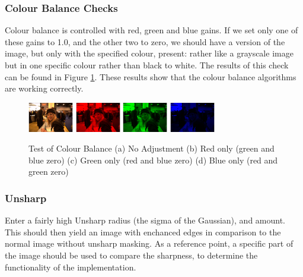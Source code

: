 \documentclass[10pt,a4paper]{article}
\begin{document}
\subsubsection{Colour Balance Checks}
Colour balance is controlled with red, green and blue gains. If we set only one of these gains to 1.0, and the other two to zero, we should
have a version of the image, but only with the specified colour, present: rather like a grayscale image but in one specific colour rather than black to white.
The results of this check can be found in Figure \ref{colourbalancetest}. These results show that the colour balance algorithms are working correctly.
\begin{figure}
    \centering
    \subfigure
    {
        \includegraphics[width=75px]{colourtest_no_adjustment}
    }
    \subfigure
    {
        \includegraphics[width=75px]{colourtest_redonly}
    }
    \subfigure
    {
        \includegraphics[width=75px]{colourtest_greenonly}
    }
    \subfigure
    {
        \includegraphics[width=75px]{blueonly}
    }
    \caption{
        Test of Colour Balance 
        (a) No Adjustment
        (b) Red only (green and blue zero)
        (c) Green only (red and blue zero)
        (d) Blue only (red and green zero)
    }
    \label{colourbalancetest}
 \end{figure}

\subsubsection{Unsharp}
Enter a fairly high Unsharp radius (the sigma of the Gaussian), and amount. This should then yield an image with enchanced edges in comparison to the normal image without unsharp masking. As a reference
point, a specific part of the image should be used to compare the sharpness, to determine the
functionality of the implementation.
\end{document}
